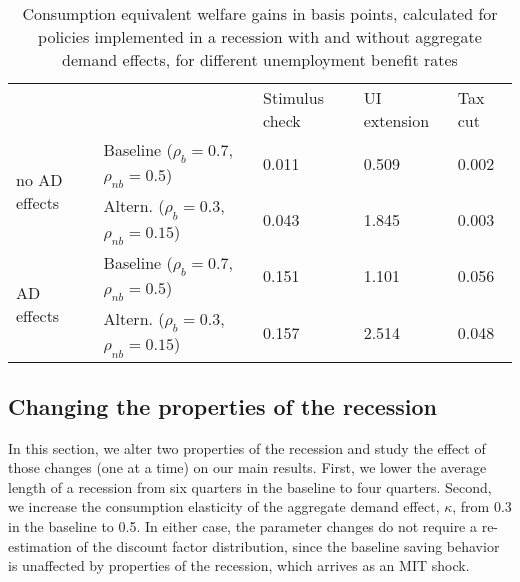 \documentclass[\PathToRoot/\ProjectName]{subfiles}
\begin{document}
\begin{table}[htbp]
  \begin{center}
    \begin{tabular}
      {@{}lllll@{}}
      \toprule
                                     &                                                     & Stimulus check & UI extension & Tax cut \\ \cmidrule(l){1-5}
      \multirow{2}{*}{no AD effects} & Baseline  ($\rho_{b}\!=\!0.7$, $\rho_{nb}\!=\!0.5$) & 0.011          & 0.509        & 0.002   \\
                                     & Altern.  ($\rho_{b}\!=\!0.3$, $\rho_{nb}\!=\!0.15$) & 0.043          & 1.845        & 0.003   \\ \cmidrule(l){1-5}
      \multirow{2}{*}{AD effects}    & Baseline  ($\rho_{b}\!=\!0.7$, $\rho_{nb}\!=\!0.5$) & 0.151          & 1.101        & 0.056   \\
                                     & Altern.  ($\rho_{b}\!=\!0.3$, $\rho_{nb}\!=\!0.15$) & 0.157          & 2.514        & 0.048   \\ \cmidrule(l){1-5}
    \end{tabular}
    \caption{Consumption equivalent welfare gains in basis points, calculated for policies implemented in a recession with and without aggregate demand effects, for different unemployment benefit rates}
    \whenintegrated{\label{tab:robustness_benefit_results}} 
  \end{center}
\end{table}

\FloatBarrier
\hypertarget{changing-the-properties-of-the-recession}{}\par\subsection*{Changing the properties of the recession}

In this section, we alter two properties of the recession and study the effect of those changes (one at a time) on our main results.
First, we lower the average length of a recession from six quarters in the baseline to four quarters.
Second, we increase the consumption elasticity of the aggregate demand effect, $\kappa$, from 0.3 in the baseline to 0.5.
In either case, the parameter changes do not require a re-estimation of the discount factor distribution, since the baseline saving behavior is unaffected by properties of the recession, which arrives as an MIT shock.
\end{document}
